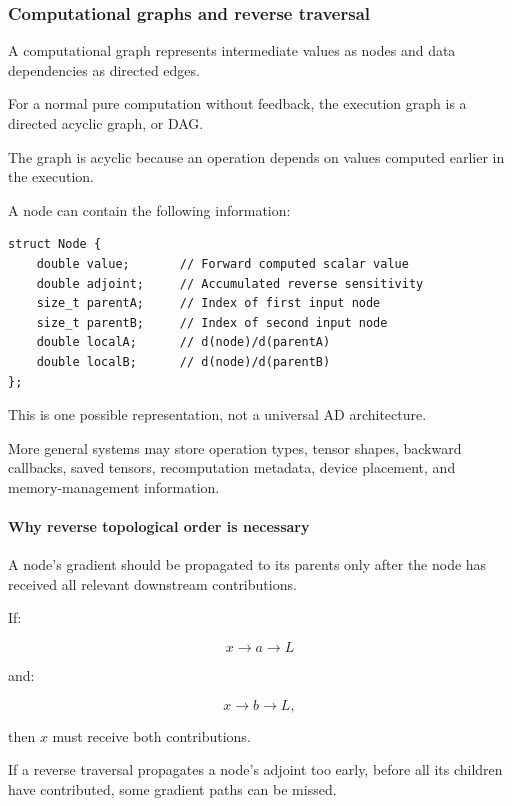 \subsubsection{Computational graphs and reverse traversal}\label{computational-graphs-and-reverse-traversal}

A computational graph represents intermediate values as nodes and data dependencies as directed edges.

For a normal pure computation without feedback, the execution graph is a directed acyclic graph, or DAG.

The graph is acyclic because an operation depends on values computed earlier in the execution.

A node can contain the following information:

\begin{verbatim}
struct Node {
    double value;       // Forward computed scalar value
    double adjoint;     // Accumulated reverse sensitivity
    size_t parentA;     // Index of first input node
    size_t parentB;     // Index of second input node
    double localA;      // d(node)/d(parentA)
    double localB;      // d(node)/d(parentB)
};
\end{verbatim}

This is one possible representation, not a universal AD architecture.

More general systems may store operation types, tensor shapes, backward callbacks, saved tensors, recomputation metadata, device placement, and memory-management information.

\paragraph{Why reverse topological order is necessary}\label{why-reverse-topological-order-is-necessary}

A node's gradient should be propagated to its parents only after the node has received all relevant downstream contributions.

If:

\[
x\rightarrow a\rightarrow L
\]

and:

\[
x\rightarrow b\rightarrow L,
\]

then \(x\) must receive both contributions.

If a reverse traversal propagates a node's adjoint too early, before all its children have contributed, some gradient paths can be missed.

